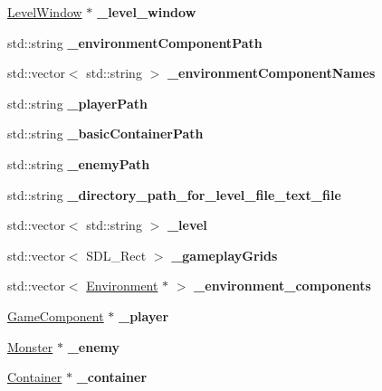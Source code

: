 \begin{DoxyCompactItemize}
\item 
\hypertarget{class_level_aa13108f91760be62ede356de5d672053}{}\label{class_level_aa13108f91760be62ede356de5d672053} 
\hyperlink{class_level_window}{Level\+Window} $\ast$ {\bfseries \+\_\+level\+\_\+window}
\item 
\hypertarget{class_level_aada31895cc425712ed153b27149a4a3e}{}\label{class_level_aada31895cc425712ed153b27149a4a3e} 
std\+::string {\bfseries \+\_\+environment\+Component\+Path}
\item 
\hypertarget{class_level_aea358fcbb8843324015450d6d64c3fca}{}\label{class_level_aea358fcbb8843324015450d6d64c3fca} 
std\+::vector$<$ std\+::string $>$ {\bfseries \+\_\+environment\+Component\+Names}
\item 
\hypertarget{class_level_a8d2f34dc13ca40b4afb67a54dfe8847e}{}\label{class_level_a8d2f34dc13ca40b4afb67a54dfe8847e} 
std\+::string {\bfseries \+\_\+player\+Path}
\item 
\hypertarget{class_level_a2c08183be323a0c31f7d02b93d68e098}{}\label{class_level_a2c08183be323a0c31f7d02b93d68e098} 
std\+::string {\bfseries \+\_\+basic\+Container\+Path}
\item 
\hypertarget{class_level_a78e37613bc65b80bc5cf71dc652b259f}{}\label{class_level_a78e37613bc65b80bc5cf71dc652b259f} 
std\+::string {\bfseries \+\_\+enemy\+Path}
\item 
\hypertarget{class_level_a68a007eb38444afd0536f038f85df306}{}\label{class_level_a68a007eb38444afd0536f038f85df306} 
std\+::string {\bfseries \+\_\+directory\+\_\+path\+\_\+for\+\_\+level\+\_\+file\+\_\+text\+\_\+file}
\item 
\hypertarget{class_level_a78c0252d860e02697e3c417e1ca173c6}{}\label{class_level_a78c0252d860e02697e3c417e1ca173c6} 
std\+::vector$<$ std\+::string $>$ {\bfseries \+\_\+level}
\item 
\hypertarget{class_level_a03f66ffad65acc6c5d46b654f27e7c81}{}\label{class_level_a03f66ffad65acc6c5d46b654f27e7c81} 
std\+::vector$<$ S\+D\+L\+\_\+\+Rect $>$ {\bfseries \+\_\+gameplay\+Grids}
\item 
\hypertarget{class_level_a1af5cc7db2c573b6f14d36f5ba19d609}{}\label{class_level_a1af5cc7db2c573b6f14d36f5ba19d609} 
std\+::vector$<$ \hyperlink{class_environment}{Environment} $\ast$ $>$ {\bfseries \+\_\+environment\+\_\+components}
\item 
\hypertarget{class_level_a0dd008af41c9a3ca0779bbaf3856e5e5}{}\label{class_level_a0dd008af41c9a3ca0779bbaf3856e5e5} 
\hyperlink{class_game_component}{Game\+Component} $\ast$ {\bfseries \+\_\+player}
\item 
\hypertarget{class_level_ad7db6f5c2cb8559da37f567219e8e22b}{}\label{class_level_ad7db6f5c2cb8559da37f567219e8e22b} 
\hyperlink{class_monster}{Monster} $\ast$ {\bfseries \+\_\+enemy}
\item 
\hypertarget{class_level_a04250fd0b458eef2ea45fffc03c26455}{}\label{class_level_a04250fd0b458eef2ea45fffc03c26455} 
\hyperlink{class_container}{Container} $\ast$ {\bfseries \+\_\+container}
\end{DoxyCompactItemize}


